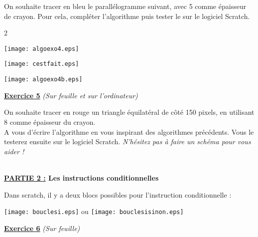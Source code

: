 \documentclass[a4paper,11pt]{article}
\newcommand{\bmul}[1]{\begin{multicols}{#1}}
\newcommand{\emul}{\end{multicols}}
\newcommand{\reponse}[1][1]{%
\multido{}{#1}{\makebox[\linewidth]{\rule[0pt]{0pt}{20pt}\dotfill}
}}
\begin{document}
On souhaite tracer en bleu le parallélogramme suivant, avec 5 comme épaisseur de crayon. Pour cela, compléter l'algorithme puis tester le sur le logiciel Scratch.

\bmul{2}

\texttt{[image: algoexo4.eps]} \\

\vspace*{0.5cm}

\texttt{[image: cestfait.eps]} \\
\columnbreak


 \texttt{[image: algoexo4b.eps]}\\

\emul


\begin{center}
\textbf{{\large \underline{Exercice 5}}} \textit{(Sur feuille et sur l'ordinateur)}
\end{center}

On souhaite tracer en rouge un triangle équilatéral de côté 150 pixels, en utilisant 8 comme épaisseur du crayon.\\
 A vous d'écrire l'algorithme en vous inspirant des algorithmes précédents. Vous le testerez ensuite sur le logiciel Scratch. \textit{N'hésitez pas à faire un schéma pour vous aider !}\\
\noindent \reponse[5]\\

\newpage

\begin{flushleft}
{\large \textbf{\underline{PARTIE 2 :} Les instructions conditionnelles}}
\end{flushleft}
\vspace*{0.4cm}

Dans scratch, il y a deux blocs possibles pour l'instruction conditionnelle :

\begin{center}
\texttt{[image: bouclesi.eps]}  \hspace*{1cm} {\large ou} \hspace*{1cm} \texttt{[image: bouclesisinon.eps]} 
\end{center}



\vspace*{0.4cm}

\begin{center}
\textbf{{\large \underline{Exercice 6}}} \textit{(Sur feuille)}
\end{center}
\end{document}
